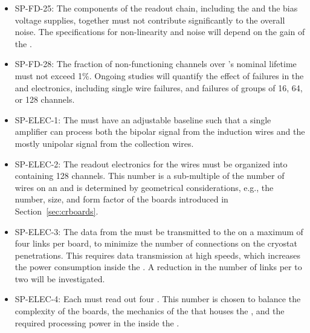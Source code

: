 \begin{itemize}
\item SP-FD-25: 
The components of the readout chain, including the 
and the bias voltage supplies, together must not contribute significantly to
the overall noise. %
The  specifications for non-linearity and noise will depend on the gain of the .



\item SP-FD-28: The fraction of non-functioning channels over %
's nominal  \dunelifetime
lifetime %
must not exceed 1\%. Ongoing studies %
will quantify the effect of failures
in the  and electronics, including
single wire failures, and failures of groups of
\num{16}, \num{64}, or \num{128} channels.

\item SP-ELEC-1: The  must have an adjustable baseline such that a single
amplifier can process both the
bipolar signal from the induction wires and the mostly unipolar signal 
from the collection wires. %

\item SP-ELEC-2: The readout electronics for the  wires must be organized
into  containing 128 channels. This number is a sub-multiple
of the number of wires on an  and is %
determined
by geometrical considerations, e.g., the number, size, and form
factor of the  boards introduced in Section~\ref{sec:crboards}.

\item SP-ELEC-3: The data from the  must be transmitted to the
 on a maximum of four links per board, to minimize
the number of connections on the cryostat penetrations. This 
requires data transmission at high speeds, which 
increases the power consumption inside the .
A reduction in the number of links per  to two
will be investigated.

\item SP-ELEC-4: Each  must read out four . This number
is chosen to %
balance %
the complexity of the boards, the mechanics
of the  that houses the , and the 
required processing power in the  inside the
.


\end{itemize}
